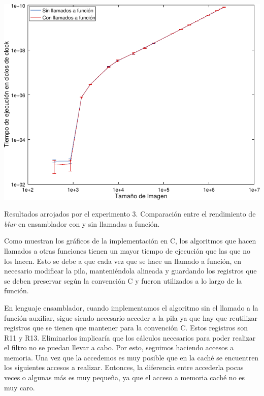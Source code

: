             \noindent{} \begin{minipage}{\textwidth}
                \begin{center}
                    \vspace{1em}
                    \includegraphics{graficos/exp3-blur-asm_vs_asm2.pdf}
                    \vspace{1em}

                    Resultados arrojados por el experimento 3. Comparación entre el rendimiento de \emph{blur} en ensamblador con y sin llamadas a función.
                \end{center}
            \end{minipage}

            Como muestran los gráficos de la implementación en C, los algoritmos que hacen llamados a otras funciones tienen un mayor tiempo de ejecución que las que no los hacen. Esto se debe a que cada vez que se hace un llamado a función, en necesario modificar la pila, manteniéndola alineada y guardando los registros que se deben preservar según la convención C y fueron utilizados a lo largo de la función.

            En lenguaje ensamblador, cuando implementamos el algoritmo sin el llamado a la función auxiliar, sigue siendo necesario acceder a la pila ya que hay que reutilizar registros que se tienen que mantener para la convención C. Estos registros son R11 y R13. Eliminarlos implicaría que los cálculos necesarios para poder realizar el filtro no se puedan llevar a cabo. Por esto, seguimos haciendo accesos a memoria. Una vez que la accedemos es muy posible que en la caché se encuentren los siguientes accesos a realizar. Entonces, la diferencia entre accederla pocas veces o algunas más es muy pequeña, ya que el acceso a memoria caché no es muy caro.

